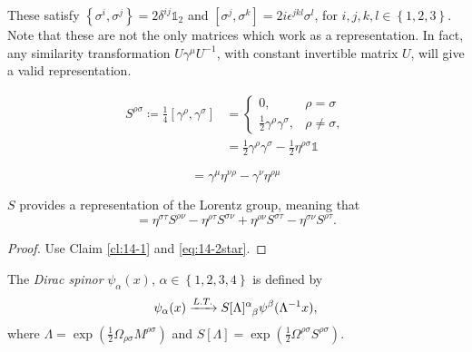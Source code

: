 These satisfy $\left\{ \sigma^i, \sigma^j\right\} = 2 \delta^{ij} \mathbb{1}_2$ and $\left[ \sigma^j, \sigma^k \right] = 2 i \epsilon^{jkl} \sigma^l$, for $i,j,k,l \in \left\{ 1, 2,3 \right\}$.
Note that these are not the only matrices which work as a representation. In fact, any similarity transformation $U \gamma^{\mu} U^{-1}$, with constant invertible matrix $U$, will give a valid representation.

\begin{definition}[]
  \begin{align}
    S^{\rho\sigma} \coloneqq \frac{1}{4} [\gamma^{\rho}, \gamma^{\sigma}] &=
    \begin{cases}
      0, & \rho = \sigma \\
      \frac{1}{2} \gamma^{\rho} \gamma^{\sigma}, & \rho \neq \sigma,
    \end{cases} \\
									  &=\frac{1}{2} \gamma^{\rho} \gamma^{\sigma} - \frac{1}{2} \eta^{\rho\sigma} \mathbb{1} \label{eq:14-2star}
  \end{align}
\end{definition}

\begin{claim}
  \label{cl:14-1}
  \begin{equation}
    [S^{\mu\nu}, \gamma^{\rho}] = \gamma^{\mu}\eta^{\nu\rho} - \gamma^{\nu} \eta^{\rho\mu}
  \end{equation}
\end{claim}
\begin{claim}
  $S$ provides a representation of the Lorentz group, meaning that
  \begin{equation}
    [S^{\rho\sigma}, S^{\tau\nu}] = \eta^{\sigma\tau} S^{\rho\nu} - \eta^{\rho\tau} S^{\sigma\nu} + \eta^{\rho\nu} S^{\sigma\tau}- \eta^{\sigma\nu} S^{\rho\tau}.
  \end{equation}
\end{claim}
\begin{proof}
  Use Claim \ref{cl:14-1} and \eqref{eq:14-2star}.
\end{proof}

\begin{definition}[]
  The \emph{Dirac spinor} $\psi_{\alpha}(x)$, $\alpha \in \left\{ 1, 2, 3, 4 \right\}$ is defined by
  \begin{equation}
    \psi_{\alpha}(x) \xrightarrow{L.T.} S[\Lambda] \indices{^{\alpha}_{\beta}} \psi^{\beta}(\Lambda^{-1} x),
  \end{equation}
  where $\Lambda = \exp(\frac{1}{2} \Omega_{\rho\sigma} M^{\rho\sigma})$ and $S[\Lambda] = \exp(\frac{1}{2} \Omega^{\rho\sigma} S^{\rho\sigma})$.
\end{definition}

